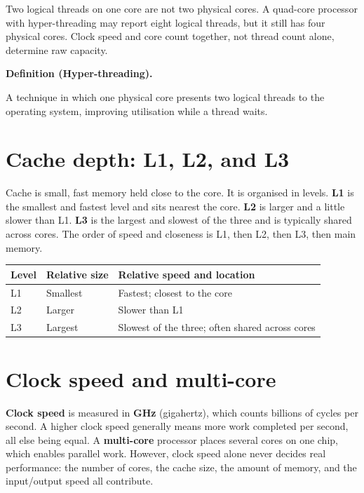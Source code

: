 \documentclass[11pt]{article}
\newenvironment{definitionbox}[1]{%
  \par\noindent\textbf{Definition (#1).}\ \itshape
}{\par\vspace{0.3em}}
\begin{document}
Two logical threads on one core are not two physical cores. A quad-core
processor with hyper-threading may report eight logical threads, but it still
has four physical cores. Clock speed and core count together, not thread
count alone, determine raw capacity.

\begin{definitionbox}{Hyper-threading}
A technique in which one physical core presents two logical threads to the
operating system, improving utilisation while a thread waits.
\end{definitionbox}

\section{Cache depth: L1, L2, and L3}
Cache is small, fast memory held close to the core. It is organised in levels.
\textbf{L1} is the smallest and fastest level and sits nearest the core.
\textbf{L2} is larger and a little slower than L1. \textbf{L3} is the largest
and slowest of the three and is typically shared across cores. The order of
speed and closeness is L1, then L2, then L3, then main memory.

\begin{center}
\begin{tabular}{p{}p{}p{}}
\toprule
\textbf{Level} & \textbf{Relative size} & \textbf{Relative speed and location}\\
\midrule
L1 & Smallest & Fastest; closest to the core\\
L2 & Larger & Slower than L1\\
L3 & Largest & Slowest of the three; often shared across cores\\
\bottomrule
\end{tabular}
\end{center}

\section{Clock speed and multi-core}
\textbf{Clock speed} is measured in \textbf{GHz} (gigahertz), which counts
billions of cycles per second. A higher clock speed generally means more work
completed per second, all else being equal. A \textbf{multi-core} processor
places several cores on one chip, which enables parallel work. However, clock
speed alone never decides real performance: the number of cores, the cache
size, the amount of memory, and the input/output speed all contribute.
\end{document}
